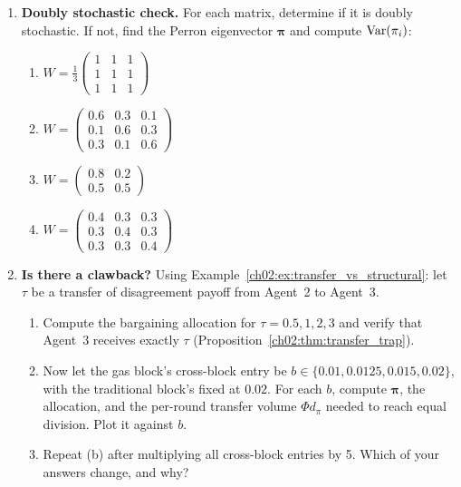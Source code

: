 \documentclass[../structural_economics_book.tex]{subfiles}
\begin{document}
\begin{enumerate}[label=\textbf{2.\arabic*}, leftmargin=3em]

\item \textbf{Doubly stochastic check.} For each matrix, determine if it is doubly stochastic. If not, find the Perron eigenvector $\boldsymbol{\pi}$ and compute $\operatorname{Var}(\pi_i)$:
\begin{enumerate}
\item $W = \frac{1}{3}\begin{pmatrix} 1 & 1 & 1 \\ 1 & 1 & 1 \\ 1 & 1 & 1 \end{pmatrix}$
\item $W = \begin{pmatrix} 0.6 & 0.3 & 0.1 \\ 0.1 & 0.6 & 0.3 \\ 0.3 & 0.1 & 0.6 \end{pmatrix}$
\item $W = \begin{pmatrix} 0.8 & 0.2 \\ 0.5 & 0.5 \end{pmatrix}$
\item $W = \begin{pmatrix} 0.4 & 0.3 & 0.3 \\ 0.3 & 0.4 & 0.3 \\ 0.3 & 0.3 & 0.4 \end{pmatrix}$
\end{enumerate}

\item \textbf{Is there a clawback?} Using Example~\ref{ch02:ex:transfer_vs_structural}: let $\tau$ be a transfer of disagreement payoff from Agent~2 to Agent~3.
\begin{enumerate}
\item Compute the bargaining allocation for $\tau = 0.5, 1, 2, 3$ and verify that Agent~3 receives exactly $\tau$ (Proposition~\ref{ch02:thm:transfer_trap}).
\item Now let the gas block's cross-block entry be $b \in \{0.01, 0.0125, 0.015, 0.02\}$, with the traditional block's fixed at $0.02$. For each $b$, compute $\boldsymbol{\pi}$, the allocation, and the per-round transfer volume $\Phi d_\pi$ needed to reach equal division. Plot it against $b$.
\item Repeat (b) after multiplying all cross-block entries by 5. Which of your answers change, and why?
\end{enumerate}


\end{enumerate}
\end{document}
